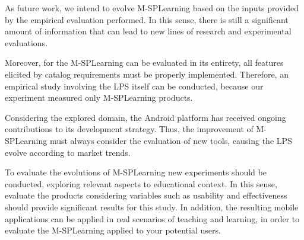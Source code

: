 As future work, we intend to evolve M-SPLearning based on the inputs provided by the empirical evaluation performed. In this sense, there is still a significant amount of information that can lead to new lines of research and experimental evaluations.

Moreover, for the M-SPLearning can be evaluated in its entirety, all features elicited by catalog requirements must be properly implemented. Therefore, an empirical study involving the LPS itself can be conducted, because our experiment measured only M-SPLearning products.

Considering the explored domain, the Android platform has received ongoing contributions to its development strategy. Thus, the improvement of M-SPLearning must always consider the evaluation of new tools, causing the LPS evolve according to market trends.

To evaluate the evolutions of M-SPLearning new experiments should be conducted, exploring relevant  aspects to educational context. In this sense, evaluate the products considering variables such as usability and effectiveness should provide significant results for this study. In addition, the resulting mobile applications can be applied in real scenarios of teaching and learning, in order to evaluate the M-SPLearning applied to your potential users.

